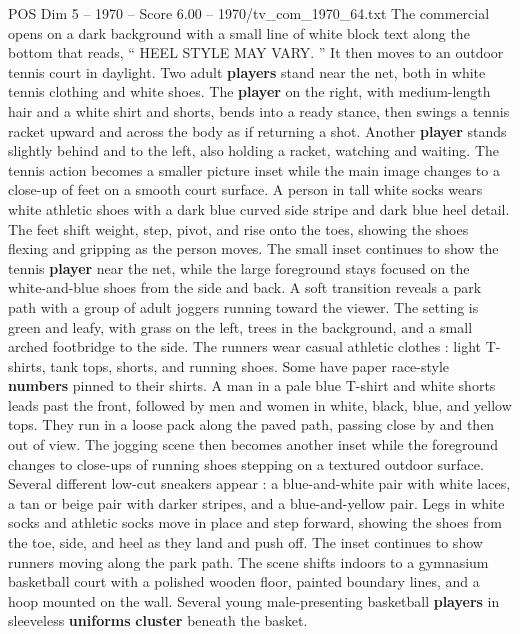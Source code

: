 \begin{textsample}{POS Dim 5 – 1970 – Score 6.00 – 1970/tv\_com\_1970\_64.txt}  \label{ex:f5_pos_085}
The commercial opens on a dark background with a small line of white block text along the bottom that reads, “ HEEL STYLE MAY VARY. ” It then moves to an outdoor tennis court in daylight.
Two adult \textbf{players} stand near the net, both in white tennis clothing and white shoes.
The \textbf{player} on the right, with medium-length hair and a white shirt and shorts, bends into a ready stance, then swings a tennis racket upward and across the body as if returning a shot.
Another \textbf{player} stands slightly behind and to the left, also holding a racket, watching and waiting.
The tennis action becomes a smaller picture inset while the main image changes to a close-up of feet on a smooth court surface.
A person in tall white socks wears white athletic shoes with a dark blue curved side stripe and dark blue heel detail.
The feet shift weight, step, pivot, and rise onto the toes, showing the shoes flexing and gripping as the person moves.
The small inset continues to show the tennis \textbf{player} near the net, while the large foreground stays focused on the white-and-blue shoes from the side and back.
A soft transition reveals a park path with a group of adult joggers running toward the viewer.
The setting is green and leafy, with grass on the left, trees in the background, and a small arched footbridge to the side.
The runners wear casual athletic clothes : light T-shirts, tank tops, shorts, and running shoes.
Some have paper race-style \textbf{numbers} pinned to their shirts.
A man in a pale blue T-shirt and white shorts leads past the front, followed by men and women in white, black, blue, and yellow tops.
They run in a loose pack along the paved path, passing close by and then out of view.
The jogging scene then becomes another inset while the foreground changes to close-ups of running shoes stepping on a textured outdoor surface.
Several different low-cut sneakers appear : a blue-and-white pair with white laces, a tan or beige pair with darker stripes, and a blue-and-yellow pair.
Legs in white socks and athletic socks move in place and step forward, showing the shoes from the toe, side, and heel as they land and push off.
The inset continues to show runners moving along the park path.
The scene shifts indoors to a gymnasium basketball court with a polished wooden floor, painted boundary lines, and a hoop mounted on the wall.
Several young male-presenting basketball \textbf{players} in sleeveless \textbf{uniforms} \textbf{cluster} beneath the basket.

\end{textsample}
